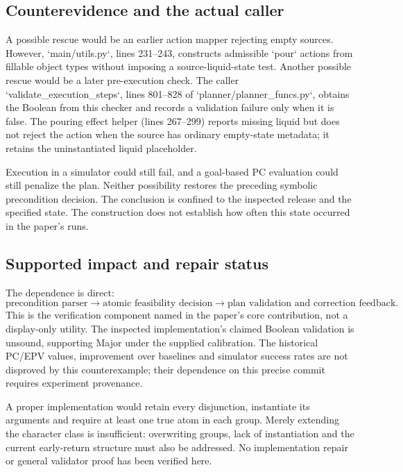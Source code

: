 \documentclass[10pt]{article}
\begin{document}
\subsection*{Counterevidence and the actual caller}
A possible rescue would be an earlier action mapper rejecting empty sources. However, `main/utils.py`, lines 231–243, constructs admissible `pour` actions from fillable object types without imposing a source-liquid-state test. Another possible rescue would be a later pre-execution check. The caller `validate\_execution\_steps`, lines 801–828 of `planner/planner\_funcs.py`, obtains the Boolean from this checker and records a validation failure only when it is false. The pouring effect helper (lines 267–299) reports missing liquid but does not reject the action when the source has ordinary empty-state metadata; it retains the uninstantiated liquid placeholder.\par
Execution in a simulator could still fail, and a goal-based PC evaluation could still penalize the plan. Neither possibility restores the preceding symbolic precondition decision. The conclusion is confined to the inspected release and the specified state. The construction does not establish how often this state occurred in the paper’s runs.\par
\subsection*{Supported impact and repair status}
The dependence is direct: \[\text{precondition parser}\longrightarrow
\text{atomic feasibility decision}\longrightarrow
\text{plan validation and correction feedback}.\] This is the verification component named in the paper’s core contribution, not a display-only utility. The inspected implementation’s claimed Boolean validation is unsound, supporting Major under the supplied calibration. The historical PC/EPV values, improvement over baselines and simulator success rates are not disproved by this counterexample; their dependence on this precise commit requires experiment provenance.\par
A proper implementation would retain every disjunction, instantiate its arguments and require at least one true atom in each group. Merely extending the character class is insufficient: overwriting groups, lack of instantiation and the current early-return structure must also be addressed. No implementation repair or general validator proof has been verified here.\par
\end{document}
